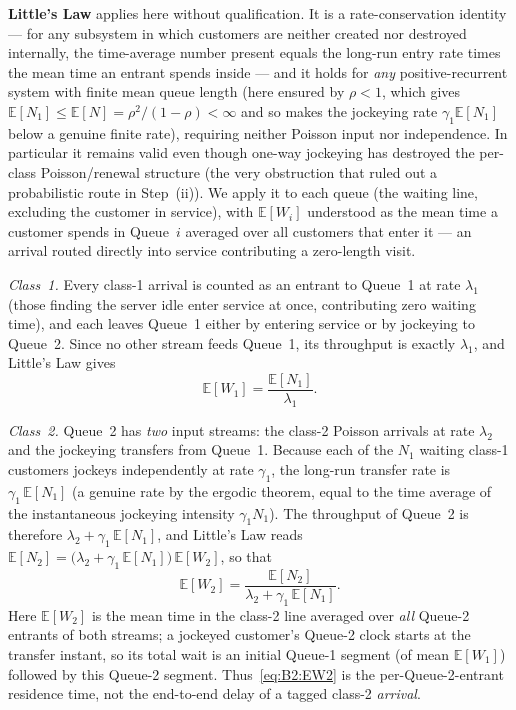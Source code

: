 \documentclass{article}
\numberwithin{equation}{section}
\begin{document}
\textbf{Little's Law} applies here without qualification. It is a rate-conservation
identity --- for any subsystem in which customers are neither created nor destroyed
internally, the time-average number present equals the long-run entry rate times the mean
time an entrant spends inside --- and it holds for \emph{any} positive-recurrent system with
finite mean queue length (here ensured by $\rho<1$, which gives
$\mathbb{E}[N_1]\le\mathbb{E}[N]=\rho^2/(1-\rho)<\infty$ and so makes the jockeying rate
$\gamma_1\mathbb{E}[N_1]$ below a genuine finite rate), requiring neither Poisson input nor
independence. In particular it remains valid even
though one-way jockeying has destroyed the per-class Poisson/renewal structure (the very
obstruction that ruled out a probabilistic route in Step~(ii)). We apply it to each queue
(the waiting line, excluding the customer in service), with $\mathbb{E}[W_i]$ understood as
the mean time a customer spends in Queue~$i$ averaged over all customers that enter it ---
an arrival routed directly into service contributing a zero-length visit.

\emph{Class~1.} Every class-1 arrival is counted as an entrant to Queue~1 at rate
$\lambda_1$ (those finding the server idle enter service at once, contributing zero waiting
time), and each leaves Queue~1 either by entering service or by jockeying to Queue~2. Since
no other stream feeds Queue~1, its throughput is exactly $\lambda_1$, and Little's Law gives
\begin{equation}
    \mathbb{E}[W_1] = \frac{\mathbb{E}[N_1]}{\lambda_1}.
    \label{eq:B2:EW}
\end{equation}

\emph{Class~2.} Queue~2 has \emph{two} input streams: the class-2 Poisson arrivals at rate
$\lambda_2$ and the jockeying transfers from Queue~1. Because each of the $N_1$ waiting
class-1 customers jockeys independently at rate $\gamma_1$, the long-run transfer rate is
$\gamma_1\,\mathbb{E}[N_1]$ (a genuine rate by the ergodic theorem, equal to the time
average of the instantaneous jockeying intensity $\gamma_1 N_1$). The throughput of Queue~2
is therefore $\lambda_2+\gamma_1\,\mathbb{E}[N_1]$, and Little's Law reads
$\mathbb{E}[N_2]=\bigl(\lambda_2+\gamma_1\,\mathbb{E}[N_1]\bigr)\,\mathbb{E}[W_2]$, so that
\begin{equation}
    \mathbb{E}[W_2] = \frac{\mathbb{E}[N_2]}{\lambda_2+\gamma_1\,\mathbb{E}[N_1]}.
    \label{eq:B2:EW2}
\end{equation}
Here $\mathbb{E}[W_2]$ is the mean time in the class-2 line averaged over \emph{all} Queue-2
entrants of both streams; a jockeyed customer's Queue-2 clock starts at the transfer
instant, so its total wait is an initial Queue-1 segment (of mean $\mathbb{E}[W_1]$) followed
by this Queue-2 segment. Thus~\eqref{eq:B2:EW2} is the per-Queue-2-entrant residence time,
not the end-to-end delay of a tagged class-2 \emph{arrival}.
\end{document}
